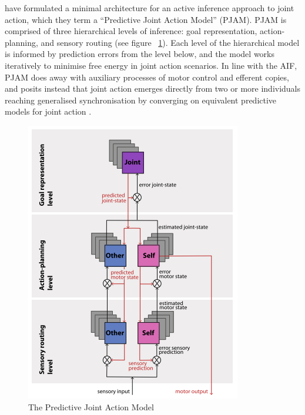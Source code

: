 \begin{CJK}{UTF8}{gbsn}
\textcite{Pesquita2017} have formulated a minimal architecture for an active inference approach to joint action, which they term a ``Predictive Joint Action Model'' (PJAM).  PJAM is comprised of three hierarchical levels of inference: goal representation, action-planning, and sensory routing (see figure ~\ref{fig:PJAM}).  Each level of the hierarchical model is informed by prediction errors from the level below, and the model works iteratively to minimise free energy in joint action scenarios.  In line with the AIF, PJAM does away with auxiliary processes of motor control and efferent copies, and posits instead that joint action emerges directly from two or more individuals reaching generalised synchronisation by converging on equivalent predictive models for joint action \citep{Friston2015}.

  \begin{figure}[htbp]
    \begin{center}
      \includegraphics[scale=.8]{images/PJAM.png}
        \caption{The Predictive Joint Action Model \citep{Pesquita2017}}
          \label{fig:PJAM}
     \end{center}
  \end{figure}


\end{CJK}
